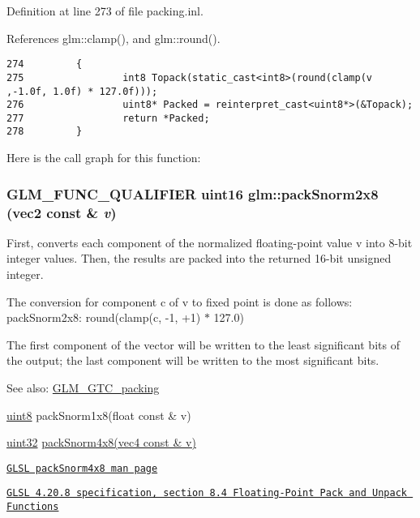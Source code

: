 Definition at line 273 of file packing.inl.

References glm::clamp(), and glm::round().

\begin{Code}\begin{verbatim}274         {
275                 int8 Topack(static_cast<int8>(round(clamp(v ,-1.0f, 1.0f) * 127.0f)));
276                 uint8* Packed = reinterpret_cast<uint8*>(&Topack);
277                 return *Packed;
278         }
\end{verbatim}
\end{Code}




Here is the call graph for this function:\hypertarget{group__gtc__packing_g05d08a82923166ec7cd5d0e6154c9953}{
\subsubsection[packSnorm2x8]{\setlength{\rightskip}{0pt plus 5cm}GLM\_\-FUNC\_\-QUALIFIER uint16 glm::packSnorm2x8 (vec2 const \& {\em v})}}
\label{group__gtc__packing_g05d08a82923166ec7cd5d0e6154c9953}


First, converts each component of the normalized floating-point value v into 8-bit integer values. Then, the results are packed into the returned 16-bit unsigned integer.

The conversion for component c of v to fixed point is done as follows: packSnorm2x8: round(clamp(c, -1, +1) $\ast$ 127.0)

The first component of the vector will be written to the least significant bits of the output; the last component will be written to the most significant bits.

\begin{Desc}
\item[See also:]\hyperlink{group__gtc__packing}{GLM\_\-GTC\_\-packing} 

\hyperlink{group__gtc__type__precision_g1a7dcd8aac97cc8020817c94049deff2}{uint8} packSnorm1x8(float const \& v) 

\hyperlink{group__gtc__type__precision_g202b6a53c105fcb7e531f9b443518451}{uint32} \hyperlink{group__core__func__packing_gfcf25acc0d361c6c696a433aa5dfd16b}{packSnorm4x8(vec4 const \& v)} 

\href{http://www.opengl.org/sdk/docs/manglsl/xhtml/packSnorm4x8.xml}{\tt GLSL packSnorm4x8 man page} 

\href{http://www.opengl.org/registry/doc/GLSLangSpec.4.20.8.pdf}{\tt GLSL 4.20.8 specification, section 8.4 Floating-Point Pack and Unpack Functions} \end{Desc}


